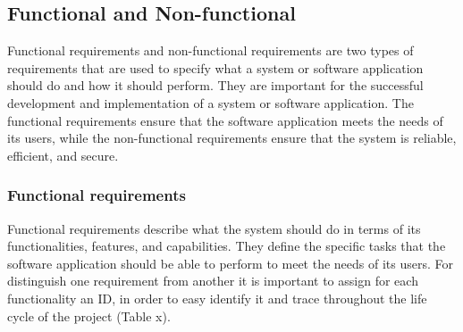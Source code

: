 \subsection{Functional and Non-functional}
Functional requirements and non-functional requirements are two types of requirements that are used
to specify what a system or software application should do and how it should perform. They are
important for the successful development and implementation of a system or software application. The
functional requirements ensure that the software application meets the needs of its users, while the
non-functional requirements ensure that the system is reliable, efficient, and secure.

\subsubsection{Functional requirements}
Functional requirements describe what the system should do in terms of its functionalities,
features, and capabilities. They define the specific tasks that the software application should be
able to perform to meet the needs of its users. For distinguish one requirement from another it is
important to assign for each functionality an ID, in order to easy identify it and trace throughout
the life cycle of the project (Table x).


